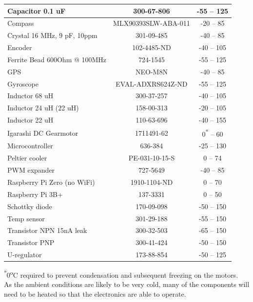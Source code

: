 \begin{center}
\begin{tabular}{ | l | c | c |}
    \hline
    Capacitor 0.1 uF & 300-67-806 & -55 – 125 \\ 
    \hline
    Compass & MLX90393SLW-ABA-011 & -20 – 85 \\ 
    \hline
    Crystal 16 MHz, 9 pF, 10ppm & 301-09-485 & -40 – 85 \\
    \hline
    Encoder & 102-4485-ND & -40 – 105 \\
    \hline
    Ferrite Bead 600Ohm @ 100MHz & 724-1545 & -55 – 125 \\
    \hline
    GPS & NEO-M8N & -40 – 85\\
    \hline
    Gyroscope & EVAL-ADXRS624Z-ND & -55 – 125 \\
    \hline
    Inductor 68 uH & 300-37-257 & -40 – 105 \\
    \hline
    Inductor 24 uH (22 uH) & 158-00-313 & -20 – 105 \\
    \hline
    Inductor 22 uH & 110-63-696 & -40 – 155\\
    \hline
    Igarashi DC Gearmotor & 1711491-62 & 0\textsuperscript{*} – 60 \\  
    \hline
    Microcontroller & 636-384 & -25 – 130 \\
    \hline
    Peltier cooler & PE-031-10-15-S & 0 – 74 \\
    \hline
    PWM expander & 727-5649 & -40 – 85 \\
    \hline
    Raspberry Pi Zero (no WiFi) & 1910-1104-ND & 0 – 70 \\
    \hline
    Raspberry Pi 3B+ & 137-3331 & 0 – 50 \\
    \hline
    Schottky diode & 170-09-098 & -50 – 150 \\
    \hline
    Temp sensor & 301-29-188 & -55 – 150 \\
    \hline
    Transistor NPN 15nA leak & 300-32-503 & -65 – 150 \\
    \hline
    Transistor PNP & 300-41-424 & -50 – 150 \\
    \hline
    U-regulator & 173-88-854 & -50 – 125\\
    \hline
\end{tabular}
\end{center}
\textsuperscript{*}0\textsuperscript{o}C required to prevent condensation and subsequent freezing on the motors.\\

As the ambient conditions are likely to be very cold, many of the components will need to be heated so that the electronics are able to operate.\\


